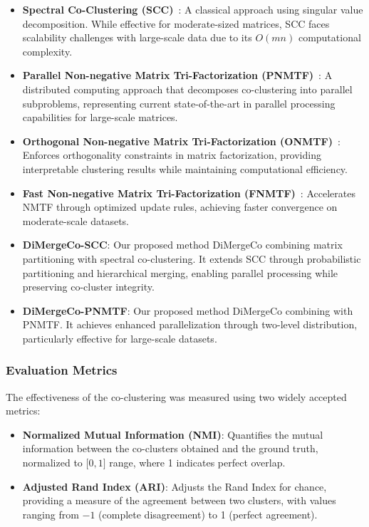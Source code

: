 \documentclass[journal]{IEEEtran}
\renewcommand{\cite}[1]{~\autocite{#1}}
\begin{document}
\begin{itemize}
    \item \textbf{Spectral Co-Clustering (SCC)}\cite{dhillon2001CoclusteringDocumentsWords}:
          A classical approach using singular value decomposition. While effective for moderate-sized matrices, SCC faces scalability challenges with large-scale data due to its $O(mn)$ computational complexity.

    \item \textbf{Parallel Non-negative Matrix Tri-Factorization (PNMTF)}\cite{chen2023ParallelNonNegativeMatrix}:
          A distributed computing approach that decomposes co-clustering into parallel subproblems, representing current state-of-the-art in parallel processing capabilities for large-scale matrices.

    \item \textbf{Orthogonal Non-negative Matrix Tri-Factorization (ONMTF)}\cite{ding2006OrthogonalNonnegativeMatrix}:
          Enforces orthogonality constraints in matrix factorization, providing interpretable clustering results while maintaining computational efficiency.

    \item \textbf{Fast Non-negative Matrix Tri-Factorization (FNMTF)}\cite{kim2011FastNonnegativeMatrix}:
          Accelerates NMTF through optimized update rules, achieving faster convergence on moderate-scale datasets.

    \item \textbf{DiMergeCo-SCC}:
          Our proposed method DiMergeCo combining matrix partitioning with spectral co-clustering. It extends SCC through probabilistic partitioning and hierarchical merging, enabling parallel processing while preserving co-cluster integrity.

    \item \textbf{DiMergeCo-PNMTF}:
          Our proposed method DiMergeCo combining with PNMTF. It achieves enhanced parallelization through two-level distribution, particularly effective for large-scale datasets.
\end{itemize}

\subsubsection{Evaluation Metrics}
The effectiveness of the co-clustering was measured using two widely accepted metrics:
\begin{itemize}
    \item \textbf{Normalized Mutual Information (NMI)}: Quantifies the mutual information between the co-clusters obtained and the ground truth, normalized to \(\lbrack 0,1 \rbrack \) range, where 1 indicates perfect overlap.
    \item \textbf{Adjusted Rand Index (ARI)}: Adjusts the Rand Index for chance, providing a measure of the agreement between two clusters, with values ranging from $-1$ (complete disagreement) to 1 (perfect agreement).
\end{itemize}
\end{document}
